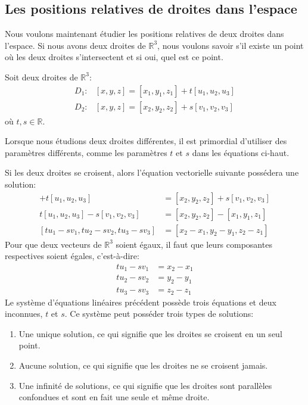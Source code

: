 \documentclass[]{book}
\providecommand{\tightlist}{%
  \setlength{\itemsep}{0pt}\setlength{\parskip}{0pt}}
\theoremstyle{definition}
\theoremstyle{definition}
\theoremstyle{definition}
\theoremstyle{remark}
\let\BeginKnitrBlock\begin \let\EndKnitrBlock\end
\begin{document}
\hypertarget{les-positions-relatives-de-droites-dans-lespace}{%
\subsection{Les positions relatives de droites dans l'espace}\label{les-positions-relatives-de-droites-dans-lespace}}

Nous voulons maintenant étudier les positions relatives de deux droites dans l'espace. Si nous avons deux droites de \(\mathbb{R}^3\), nous voulons savoir s'il existe un point où les deux droites s'intersectent et si oui, quel est ce point.

Soit deux droites de \(\mathbb{R}^3\):
\begin{align*}
D_1 :& [x,y,z] = [x_1,y_1,z_1] + t[u_1,u_2,u_3] \\
D_2 :& [x,y,z] = [x_2,y_2,z_2] + s[v_1,v_2,v_3]
\end{align*}
où \(t,s\in\mathbb{R}\).

\BeginKnitrBlock{remark}
{}Lorsque nous étudions deux droites différentes, il est primordial d'utiliser des paramètres différents, comme les paramètres \(t\) et \(s\) dans les équations ci-haut.
\EndKnitrBlock{remark}

Si les deux droites se croisent, alors l'équation vectorielle suivante possédera une solution:
\begin{align*}
[x_1,y_1,z_1] + t[u_1,u_2,u_3] &= [x_2,y_2,z_2] + s[v_1,v_2,v_3] \\
t[u_1,u_2,u_3]-s[v_1,v_2,v_3] &= [x_2,y_2,z_2]-[x_1,y_1,z_1] \\
[tu_1-sv_1,tu_2-sv_2,tu_3-sv_3] &= [x_2-x_1,y_2-y_1,z_2-z_1]
\end{align*}
Pour que deux vecteurs de \(\mathbb{R}^3\) soient égaux, il faut que leurs composantes respectives soient égales, c'est-à-dire:
\begin{align*}
tu_1-sv_1 &= x_2-x_1 \\
tu_2-sv_2 &= y_2-y_1 \\
tu_3-sv_3 &= z_2-z_1
\end{align*}
Le système d'équations linéaires précédent possède trois équations et deux inconnues, \(t\) et \(s\). Ce système peut posséder trois types de solutions:

\begin{enumerate}
\def\labelenumi{\arabic{enumi}.}
\tightlist
\item
  Une unique solution, ce qui signifie que les droites se croisent en un seul point.
\item
  Aucune solution, ce qui signifie que les droites ne se croisent jamais.
\item
  Une infinité de solutions, ce qui signifie que les droites sont parallèles confondues et sont en fait une seule et même droite.
\end{enumerate}
\end{document}
